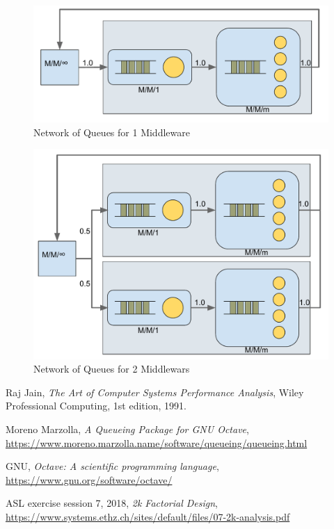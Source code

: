 \documentclass[11pt,a4paper]{article}
\begin{document}
\begin{figure}
    \includegraphics[width=.5\linewidth]{plots/NetworkOfQueues1MW.pdf}
    \caption{Network of Queues for 1 Middleware}
    \label{fig:7-3:1MW}
\end{figure}

\begin{figure}
    \includegraphics[width=.5\linewidth]{plots/NetworkOfQueues2MW.pdf}
    \caption{Network of Queues for 2 Middlewars}
    \label{fig:7-3:2MW}
\end{figure}

\begin{thebibliography}{9}

  Raj Jain,
  \textit{The Art of Computer Systems Performance Analysis},
  Wiley Professional Computing, 1st edition, 1991.

    Moreno Marzolla,
    \textit{A Queueing Package for GNU Octave},
    \url{https://www.moreno.marzolla.name/software/queueing/queueing.html}
    
    GNU,
    \textit{Octave: A scientific programming language},
    \url{https://www.gnu.org/software/octave/}

    ASL exercise session 7, 2018,
    \textit{2k Factorial Design},
    \url{https://www.systems.ethz.ch/sites/default/files/07-2k-analysis.pdf}
\end{thebibliography}
\end{document}
